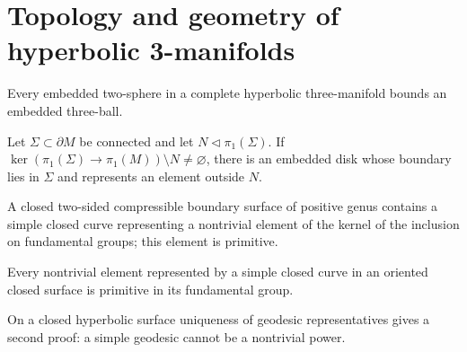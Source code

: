 \section{Topology and geometry of hyperbolic 3-manifolds}

\begin{lemma}
\label{lem:chow-iv-hyperbolic-irreducible}
Every embedded two-sphere in a complete hyperbolic three-manifold bounds an
embedded three-ball.
\end{lemma}

\begin{theorem}
\label{thm:chow-iv-loop-theorem}
Let \(\Sigma\subset\partial M\) be connected and let \(N\lhd\pi_1(\Sigma)\).
If \(\ker(\pi_1(\Sigma)\to\pi_1(M))\setminus N\ne\varnothing\), there is an
embedded disk whose boundary lies in \(\Sigma\) and represents an element
outside \(N\).
\end{theorem}

\begin{corollary}
\label{cor:chow-iv-compressible-boundary}
A closed two-sided compressible boundary surface of positive genus contains a
simple closed curve representing a nontrivial element of the kernel of the
inclusion on fundamental groups; this element is primitive.
\end{corollary}

\begin{lemma}
\label{lem:chow-iv-simple-curve-primitive}
Every nontrivial element represented by a simple closed curve in an oriented
closed surface is primitive in its fundamental group.
\end{lemma}

\begin{remark}
\label{rem:chow-iv-geodesic-primitivity}
On a closed hyperbolic surface uniqueness of geodesic representatives gives a
second proof: a simple geodesic cannot be a nontrivial power.
\end{remark}

